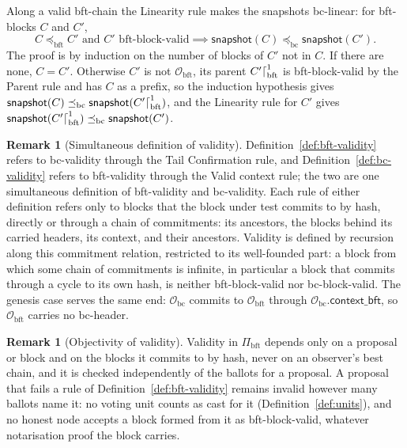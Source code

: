 \documentclass[11pt,a4paper]{article}
\theoremstyle{definition}
\newtheorem{remark}[theorem]{Remark}
\newcommand{\bc}{\mathrm{bc}}
\newcommand{\bft}{\mathrm{bft}}
\newcommand{\Origin}{\mathcal{O}}
\newcommand{\Obc}{\Origin_{\bc}}
\newcommand{\Obft}{\Origin_{\bft}}
\newcommand{\preceqbc}{\preceq_{\bc}}
\newcommand{\preceqbft}{\preceq_{\bft}}
\newcommand{\Pibft}{\Pi_{\bft}}
\newcommand{\contextbft}{\mathsf{context\_bft}}
\newcommand{\snapshot}{\mathsf{snapshot}}
\begin{document}
Along a valid bft-chain the Linearity rule makes the snapshots bc-linear:
for bft-blocks $C$ and $C'$,
\begin{equation}\label{eq:cons-snap-linear}
  C \preceqbft C' \text{ and } C' \text{ bft-block-valid}
  \implies \snapshot(C) \preceqbc \snapshot(C').
\end{equation}
The proof is by induction on the number of blocks of $C'$ not in $C$. If
there are none, $C = C'$. Otherwise $C'$ is not $\Obft$, its parent
$C'\trunc[\bft]{1}$ is bft-block-valid by the Parent rule and has $C$ as a
prefix, so the induction hypothesis gives $\snapshot(C) \preceqbc
\snapshot(C'\trunc[\bft]{1})$, and the Linearity rule for $C'$ gives
$\snapshot(C'\trunc[\bft]{1}) \preceqbc \snapshot(C')$.

\begin{remark}[Simultaneous definition of validity]
\label{rem:validity-recursion}
Definition~\ref{def:bft-validity} refers to bc-validity through the Tail
Confirmation rule, and Definition~\ref{def:bc-validity} refers to
bft-validity through the Valid context rule; the two are one simultaneous
definition of bft-validity and bc-validity. Each rule of either definition
refers only to blocks that the block under test commits to by hash, directly
or through a chain of commitments: its ancestors, the blocks behind its
carried headers, its context, and their ancestors. Validity is defined by
recursion along this commitment relation, restricted to its well-founded
part: a block from which some chain of commitments is infinite, in particular
a block that commits through a cycle to its own hash, is neither
bft-block-valid nor bc-block-valid. The genesis case serves
the same end: $\Obc$ commits to $\Obft$ through $\Obc.\contextbft$, so
$\Obft$ carries no bc-header.
\end{remark}

\begin{remark}[Objectivity of validity]\label{rem:objective}
Validity in $\Pibft$ depends only on a proposal or block and on the blocks
it commits to by hash, never on an observer's best chain, and it is checked
independently of the ballots for a proposal. A proposal that fails a rule
of Definition~\ref{def:bft-validity} remains invalid however many ballots
name it: no voting unit counts as cast for it (Definition~\ref{def:units}), and
no honest node accepts a block formed from it as bft-block-valid, whatever
notarisation proof the block carries.
\end{remark}
\end{document}
